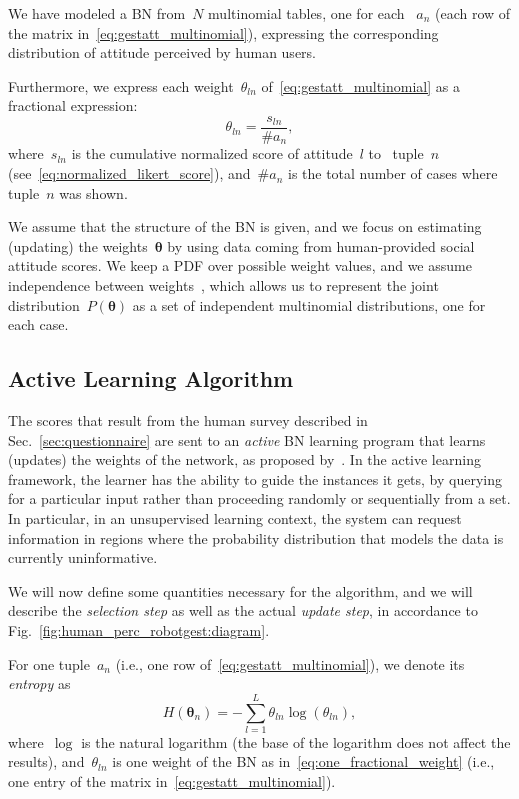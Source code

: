 We have modeled a \acl{BN} from~$N$ multinomial tables, one for each \gestparval{}~$a_n$ (each row of the matrix in~\eqref{eq:gestatt_multinomial}), expressing the corresponding distribution of attitude perceived by human users.

Furthermore, we express each weight~$\theta_{ln}$ of~\eqref{eq:gestatt_multinomial} as a fractional expression:
\begin{equation} \label{eq:one_fractional_weight}
\theta_{ln} = \frac{s_{ln}}{\#a_n},
\end{equation}
where~$s_{ln}$ is the cumulative normalized score of attitude~$l$ to~\gestparval{} tuple~$n$ (see~\eqref{eq:normalized_likert_score}), and~$\#a_n$ is the total number of cases where \gestparval{} tuple~$n$ was shown.

We assume that the structure of the \acl{BN} is given, and we focus on estimating (updating) the weights~$\bm{\theta}$ by using data coming from human-provided social attitude scores. We keep a \ac{PDF} over possible weight values, and we assume independence between weights~\cite{tong:2000}, which allows us to represent the joint distribution~$P(\bm{\theta})$ as a set of independent multinomial distributions, one for each \gestparval{} case.

\subsection{Active Learning Algorithm}
\label{sec:active_learning}

The scores that result from the human survey described in Sec.~\ref{sec:questionnaire} are sent to an \emph{active} \acl{BN} learning program that learns (updates) the weights of the network, as proposed by~\cite{tong:2000}. In the active learning framework, the learner has the ability to guide the instances it gets, by querying for a particular input rather than proceeding randomly or sequentially from a set. In particular, in an unsupervised learning context, the system can request information in regions where the probability distribution that models the data is currently uninformative.

We will now define some quantities necessary for the algorithm, and we will describe the \emph{selection step} as well as the actual \emph{update step}, in accordance to Fig.~\ref{fig:human_perc_robotgest:diagram}.

For one \gestparval{} tuple~$a_n$ (i.e., one row of~\eqref{eq:gestatt_multinomial}), we denote its \emph{entropy} as
\begin{equation} \label{eq:entropy_prior}
H(\bm{\theta}_n) = - \sum_{l=1}^{L} \theta_{ln} \log (\theta_{ln}),
\end{equation}
where~$\log$ is the natural logarithm (the base of the logarithm does not affect the results), and~$\theta_{ln}$ is one weight of the \ac{BN} as in~\eqref{eq:one_fractional_weight} (i.e., one entry of the matrix in~\eqref{eq:gestatt_multinomial}).

